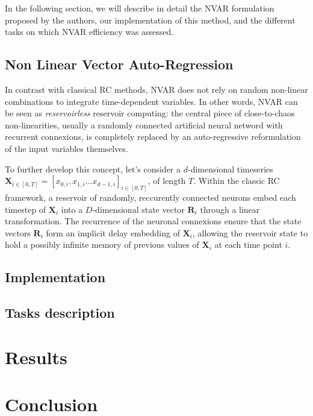 In the following section, we will describe in detail the NVAR formulation proposed by the authors, our implementation
of this method, and the different tasks on which NVAR efficiency was assessed.


\subsection{Non Linear Vector Auto-Regression}

In contrast with classical RC methods, NVAR does not rely on random non-linear combinations to
integrate time-dependent variables. In other words, NVAR can be seen as \textit{reservoirless} 
reservoir computing: the central piece of close-to-chaos non-linearities, usually a randomly
connected artificial neural netword with recurrent connexions, is completely replaced 
by an auto-regressive reformulation of the input variables themselves. 

To further develop this concept, let's consider a $d$-dimensional timeseries 
$\mathbf{X}_{i \in [0, T]} = [x_{0, i}, x_{1, i} \dots x_{d-1, i}]_{i \in [0, T]}$, of length $T$.
Within the classic RC framework, a reservoir of randomly, reccurently connected neurons
embed each timestep of $\mathbf{X}_i$ into a $D$-dimensional state vector $\mathbf{R}_i$
through a linear transformation. 
The recurrence of the neuronal connexions ensure that the state vectors $\mathbf{R}_i$ 
form an implicit delay embedding of $\mathbf{X}_i$, allowing the reservoir state to hold 
a possibly infinite memory of previous values of $\mathbf{X}_i$ at each time point $i$.


\subsection{Implementation}

\subsection{Tasks description}

\section{Results}

\section{Conclusion}
